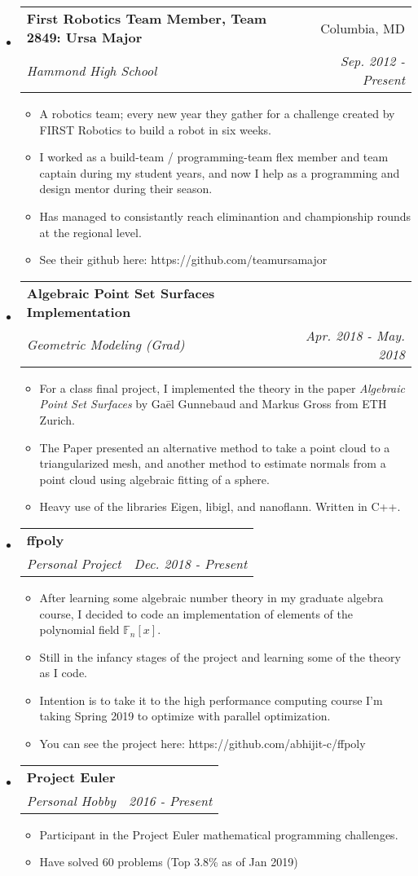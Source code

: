 \documentclass[letterpaper,11pt]{article}
\makeatletter
\newcommand{\resitem}[1]{\item #1 \vspace{-2pt}}
\newcommand{\resheading}[1]{{\large \parashade[.9]{sharpcorners}{\textbf{#1 \vphantom{p\^{E}}}}}}
\newcommand{\ressubheading}[4]{
\begin{tabular*}{6.5in}{l@{\extracolsep{\fill}}r}
		\textbf{#1} & #2 \\
		\textit{#3} & \textit{#4} \\
\end{tabular*}\vspace{-6pt}}
\makeatother
\begin{document}
\resheading{Projects and Activities}
\begin{itemize}
\item
	\ressubheading{First Robotics Team Member, Team 2849: Ursa Major}{Columbia, MD}{Hammond High
    School}{Sep. 2012 - Present}
	\begin{itemize}
		\resitem{A robotics team; every new year they gather for a challenge
        created by FIRST Robotics to build a robot in six weeks.}
        \resitem{I worked as a build-team / programming-team flex member and
        team captain during my student years, and now I help as a programming
        and design mentor during their season.}
        \resitem{Has managed to consistantly reach eliminantion and championship
        rounds at the regional level.}
        \resitem{See their github here: https://github.com/teamursamajor}
	\end{itemize}

\item
	\ressubheading{Algebraic Point Set Surfaces Implementation}{}{Geometric
    Modeling (Grad)}{Apr. 2018 - May. 2018}
	\begin{itemize}
		\resitem{For a class final project, I implemented the theory in the
        paper \textit{Algebraic Point Set Surfaces} by Ga\={e}l Gunnebaud and
        Markus Gross from ETH Zurich.}
        \resitem{The Paper presented an alternative method to take a point cloud
        to a triangularized mesh, and another method to estimate normals from a
        point cloud using algebraic fitting of a sphere.}
        \resitem{Heavy use of the libraries Eigen, libigl, and nanoflann.
        Written in C++.}
	\end{itemize}

\item
	\ressubheading{ffpoly}{}{Personal Project}{Dec. 2018 - Present}
	\begin{itemize}
		\resitem{After learning some algebraic number theory in my graduate
        algebra course, I decided to code an implementation of elements of the
        polynomial field $\mathbb{F}_n[x]$.}
        \resitem{Still in the infancy stages of the project and learning some of
        the theory as I code.}
        \resitem{Intention is to take it to the high performance computing
        course I'm taking Spring 2019 to optimize with parallel optimization.}
        \resitem{You can see the project here:
        https://github.com/abhijit-c/ffpoly}
	\end{itemize}

\item
	\ressubheading{Project Euler}{}{Personal Hobby}{2016 - Present}
	\begin{itemize}
		\resitem{Participant in the Project Euler mathematical programming
        challenges.}
        \resitem{Have solved 60 problems (Top 3.8\% as of Jan 2019)}
	\end{itemize}

\end{itemize}
\end{document}
